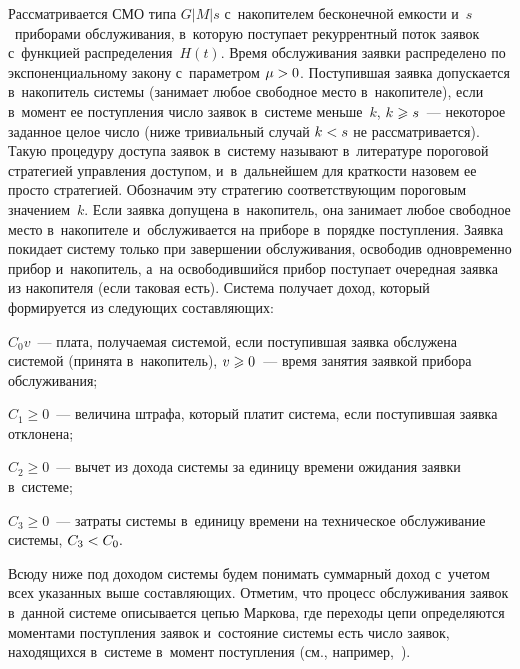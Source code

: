 \begin{multicols}{2}
Рассматривается СМО типа $G|M|s$ с~накопителем бесконечной емкости
и~$s$~приборами обслуживания, в~которую поступает рекуррентный поток
заявок с~функцией  распределения~$H(t)$. Время обслуживания
заявки распределено по экспоненциальному закону с~параметром
$\mu\hm>0$. Поступившая заявка допускается в~накопитель системы
(занимает любое свободное место в~накопителе), если в~момент ее
поступления число заявок в~системе меньше~$k$, $k\hm\geqslant s$~---
некоторое заданное целое число (ниже тривиальный случай $k\hm<s$ не
рассматривается). Такую процедуру доступа заявок в~систему
называют в~литературе пороговой стратегией управ\-ле\-ния доступом, 
и~в~дальнейшем для краткости назовем ее просто стратегией. Обозначим эту стратегию
соответствующим пороговым значением~$k$. Если заявка допущена 
в~накопитель, она занимает любое свободное место в~накопителе 
и~обслуживается на приборе в~порядке поступления. Заявка покидает
систему только при завершении обслуживания, освободив одновременно
прибор и~накопитель, а~на освободившийся прибор поступает
очередная заявка из накопителя (если таковая есть). Система получает
доход, который формируется из следующих составляющих:
\begin{description}
\item $C_0v$~--- плата, получаемая системой, если поступившая заявка
обслужена  системой (принята в~накопитель), $v\hm\geqslant 0$~--- время занятия заявкой прибора
 обслуживания;\\[-14.5pt]
\item
$C_1\geqslant 0$~--- величина штрафа, который платит сис\-те\-ма, если
поступившая заявка отклонена;\\[-14.5pt]
\item
$C_2\geqslant 0$~--- вычет из дохода системы за единицу времени ожидания
заявки в~системе;\\[-14.5pt]
\item
$C_3\geqslant 0$~--- затраты системы в~единицу времени на техническое
обслуживание системы, $C_3\hm<C_0.$
\end{description}

Всюду ниже под доходом системы будем понимать суммарный доход 
с~учетом всех указанных выше со\-став\-ля\-ющих. Отметим, что процесс
обслуживания заявок в~данной сис\-те\-ме описывается цепью Маркова,
где переходы цепи определяются моментами поступления заявок 
и~состояние сис\-те\-мы есть чис\-ло заявок, находящихся в~сис\-те\-ме 
в~момент поступления (см., например,~\cite{8-aga, 9-aga}).


\end{multicols}
